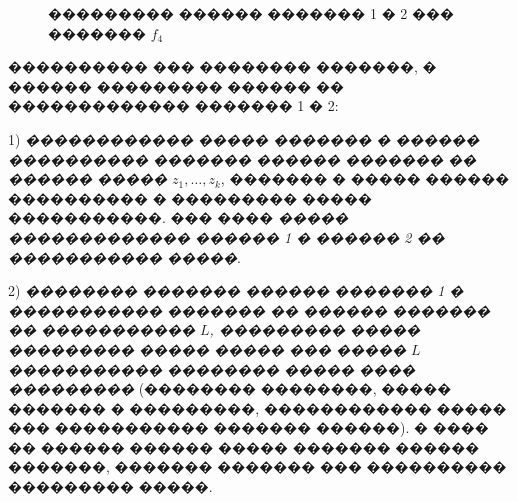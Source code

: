 \documentclass[a4paper]{article}
\begin{document}
\begin{figure}[h!]
  \caption{��������� ������ ������� 1 � 2 ��� ������� $f_4$}
  \label{send}
\end{figure}

\FloatBarrier
���������� ��� �������� �������, � ������ ��������� ������ �� ������������� ������� 1 � 2:

  1) {\it������������ ����� ������� � ������ ���������� ������� ������ ������� �� ������ ����� $z_1, \dots, z_k$}, ������� � ����� ������ ���������� � ��������� ����� �����������. ��� ���� {\it����� ������������� ������ 1 � ������ 2 �� ����������� �����}.
  
  2) {\it�������� ������� ������ ������� 1 � ����������� ������� �� ������ ������� �� ����������� $L$, ��������� ����� ��������� ����� ����� ��� ����� $L$ ����������� �������� ����� ���� ���������} (�������� ��������, ����� ������� � ���������, ������������ ����� ��� ����������� ������� ������). � ���� �� ������ ������ ����� ������� ������ �������, ������� ������� ��� ���������� ��������� �����.
  
\end{document}
